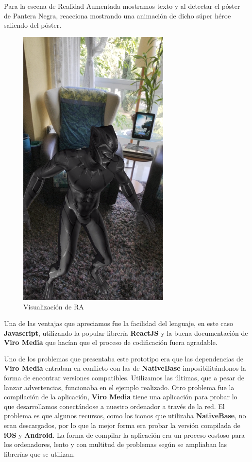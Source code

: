 \begin{flushleft}
Para la escena de Realidad Aumentada mostramos texto y al detectar el póster de Pantera Negra,
 reacciona mostrando una animación de dicho súper héroe saliendo del póster.
\end{flushleft}
 
\begin{figure}[H]
    \centering
    \includegraphics[width=3in]{figures/chapter-3/viromedia/blackpanther.png}
    \caption{Visualización de RA}
\end{figure}

\begin{flushleft}
Una de las ventajas que apreciamos fue la facilidad del lenguaje, en este caso \textbf{Javascript},
 utilizando la popular librería \textbf{ReactJS} y la buena documentación de \textbf{Viro Media}
 que hacían que el proceso de codificación fuera agradable.
\end{flushleft}
\begin{flushleft}
Uno de los problemas que presentaba este prototipo era que las dependencias de \textbf{Viro Media} entraban en conflicto con las de \textbf{NativeBase}
imposibilitándonos la forma de encontrar versiones compatibles. Utilizamos las últimas, que a pesar de lanzar
 advertencias, funcionaba en el ejemplo realizado.
Otro problema fue la compilación de la aplicación, \textbf{Viro Media} tiene una aplicación para probar lo
 que desarrollamos conectándose a nuestro ordenador a través de la red. El problema es
 que algunos recursos, como los iconos que utilizaba \textbf{NativeBase}, no eran descargados, por lo que la
 mejor forma era probar la versión compilada de \textbf{iOS} y \textbf{Android}. La forma de compilar
 la aplicación era un proceso costoso para los ordenadores, lento y con multitud de problemas según
 se ampliaban las librerías que se utilizan.
\end{flushleft}

